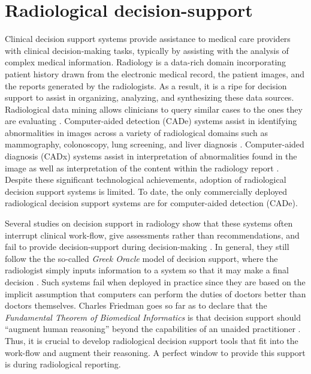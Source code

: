 \section{Radiological decision-support}
Clinical decision support systems provide assistance to medical care providers with clinical decision-making tasks, typically by assisting with the analysis of complex medical information. Radiology is a data-rich domain incorporating patient history drawn from the electronic medical record, the patient images, and the reports generated by the radiologists. As a result, it is a ripe for decision support to assist in organizing, analyzing, and synthesizing these data sources. Radiological data mining allows clinicians to query similar cases to the ones they are evaluating \cite{Shin:2015wl,Bozkurt:2014jw,Depeursinge:2012ce,Korenblum:2011gx,Akgul:2011ey,Nassif:2009du}. Computer-aided detection (CADe) systems assist in identifying abnormalities in images across a variety of radiological domains such as mammography, colonoscopy, lung screening, and liver diagnosis \cite{Cheng:2003ig,Castellino:2005ke,Meeuwis:2010bv,Oliver:2010fm,Fenton:2011fw,Fenton:2012kz,Jamieson:2012hz,Gallas:2012eg,Giger:2013jb}. Computer-aided diagnosis (CADx) systems assist in interpretation of abnormalities found in the image \cite{Jiang:1999fj,ElizabethS:2005gc,Gallas:2012eg,Bright:2012ga,Giger:2013jb,Depeursinge:2010jl,Fujita:2008it,Eadie:2011cv,Rubin:2005jg,Garg:2005cb,Elter:2009fv,Jamieson:2010vl,Jamieson:2010tt,Cheng:2003ig,Jiang:2001fy} as well as interpretation of the content within the radiology report \cite{Burnside:2000wl,ElizabethS:2005gc,Burnside:2009br,Rubin:2005jg}. Despite these significant technological achievements, adoption of radiological decision support systems is limited. To date, the only commercially deployed radiological decision support systems are for computer-aided detection (CADe). 

Several studies on decision support in radiology show that these systems often interrupt clinical  work-flow, give assessments rather than recommendations, and fail to provide decision-support during decision-making \cite{Kawamoto:2005gn,Morgan:2011ct}. In general, they still follow the the so-called \emph{Greek Oracle} model of decision support, where the radiologist simply inputs information to a system so that it may make a final decision \cite{Miller:1990wg,Miller:1994cx}. Such systems fail when deployed in practice since they are based on the implicit assumption that computers can perform the duties of doctors better than doctors themselves. Charles Friedman goes so far as to declare that the \emph{Fundamental Theorem of Biomedical Informatics} is that decision support should ``augment human reasoning'' beyond the capabilities of an unaided practitioner \cite{Friedman:2009dx}. Thus, it is crucial to develop radiological decision support tools that fit into the work-flow and augment their reasoning. A perfect window to provide this support is during radiological reporting.


